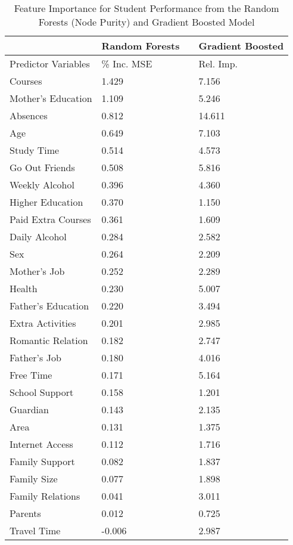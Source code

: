 \documentclass[sigconf]{acmart}
\begin{document}
\begin{table}
  \caption{Feature Importance for Student Performance from the Random Forests 
  (Node Purity) and Gradient Boosted Model}
  \label{tab:freq}
  \begin{tabular}{llll}
    \toprule
            & Random  Forests & & Gradient Boosted \\    
    \midrule   
    
    Predictor Variables & \% Inc. MSE & & Rel. Imp. \\    
    \midrule
    Courses             &  1.429 &   &  7.156 \\ 
    Mother's Education  &  1.109 &   &  5.246 \\
    Absences            &  0.812 &   & 14.611 \\
    Age                 &  0.649 &   &  7.103 \\
    Study Time          &  0.514 &   &  4.573 \\     
    Go Out Friends      &  0.508 &   &  5.816 \\
    Weekly Alcohol      &  0.396 &   &  4.360 \\
    Higher Education    &  0.370 &   &  1.150 \\   
    Paid Extra Courses  &  0.361 &   &  1.609 \\
    Daily Alcohol       &  0.284 &   &  2.582 \\
    Sex                 &  0.264 &   &  2.209 \\
    Mother's Job        &  0.252 &   &  2.289 \\   
    Health              &  0.230 &   &  5.007 \\ 
    Father's Education  &  0.220 &   &  3.494 \\   
    Extra Activities    &  0.201 &   &  2.985 \\
    Romantic Relation   &  0.182 &   &  2.747 \\
    Father's Job        &  0.180 &   &  4.016 \\   
    Free Time           &  0.171 &   &  5.164 \\
    School Support      &  0.158 &   &  1.201 \\    
    Guardian            &  0.143 &   &  2.135 \\
    Area                &  0.131 &   &  1.375 \\
    Internet Access     &  0.112 &   &  1.716 \\    
    Family Support      &  0.082 &   &  1.837 \\
    Family Size         &  0.077 &   &  1.898 \\
    Family Relations    &  0.041 &   &  3.011 \\
    Parents             &  0.012 &   &  0.725 \\
    Travel Time         & -0.006 &   &  2.987 \\  
    \bottomrule
  \end{tabular}
\end{table}
\end{document}
